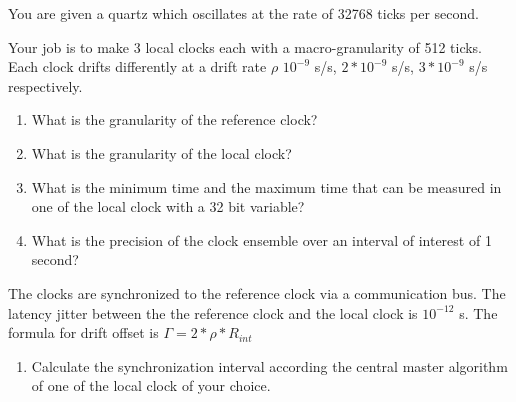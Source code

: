 
\pagebreak



You are given a quartz which oscillates at the rate of 32768 ticks per second. 

Your job is to make 3 local clocks each with a macro-granularity of 512 ticks. Each clock drifts differently at a drift rate $\rho$ $10^{-9}$ s/s, $2*10^{-9}$ s/s, $3*10^{-9}$ s/s respectively.

\begin{enumerate}
    \addtocounter{enumi}{0}
\item What is the granularity of the reference clock?
\item What is the granularity of the local clock?
\item What is the minimum time and the maximum time that can be measured in one of the local clock with a 32 bit variable?
\item What is the precision of the clock ensemble over an interval of interest of 1 second?
\end{enumerate}


The clocks are synchronized to the reference clock via a communication bus. The latency jitter between the the reference clock and the local clock is $10^{-12}$ s.
The formula for drift offset is $\Gamma =  2 * \rho * R_{int}$

\begin{enumerate}
    \addtocounter{enumi}{4}
\item Calculate the synchronization interval according the central master algorithm of one of the local clock of your choice.

\end{enumerate}


